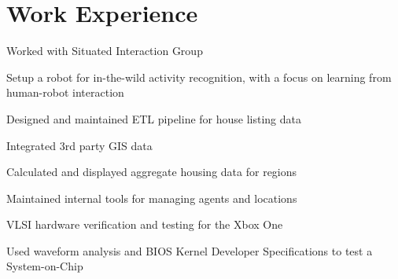 \documentclass[]{deedy-resume}
\begin{document}
\hfill
\begin{minipage}[t]{0.66\textwidth}


\section{Work Experience}
\vspace{0.3cm}
\begin{tightemize}
\item Worked with Situated Interaction Group
\item Setup a robot for in-the-wild activity recognition, with a focus on learning from human-robot interaction
\end{tightemize}
\sectionsep

\begin{tightemize}
\item Designed and maintained ETL pipeline for house listing data
\item Integrated 3rd party GIS data
\item Calculated and displayed aggregate housing data for regions
\item Maintained internal tools for managing agents and locations
\end{tightemize}
\sectionsep

\begin{tightemize}
\item VLSI hardware verification and testing for the Xbox One
\item Used waveform analysis and BIOS Kernel Developer Specifications to test a System-on-Chip
\end{tightemize}
\sectionsep



\end{minipage}
\end{document}
